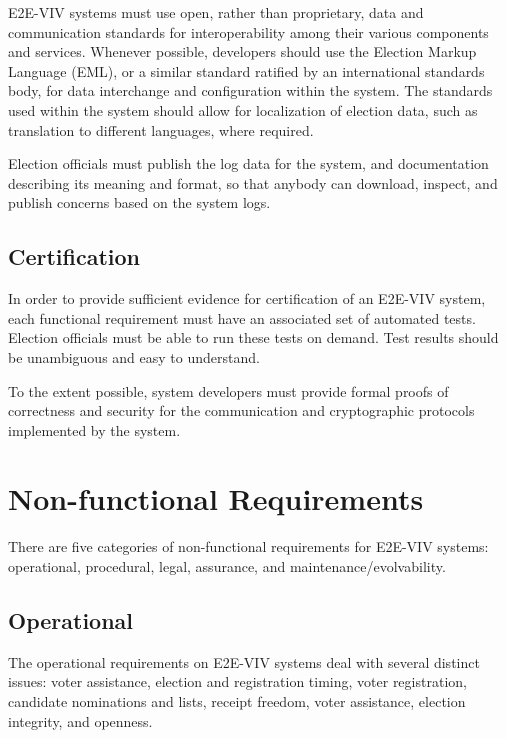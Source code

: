 E2E-VIV systems must use open, rather than proprietary, data and
communication standards for interoperability among their various
components and services. Whenever possible, developers should use the
Election Markup Language (EML), or a similar standard ratified by an
international standards body, for data interchange and configuration
within the system. The standards used within the system should allow
for localization of election data, such as translation to different
languages, where required.

Election officials must publish the log data for the system, and
documentation describing its meaning and format, so that anybody can
download, inspect, and publish concerns based on the system logs.

\subsection{Certification}

In order to provide sufficient evidence for certification of an
E2E-VIV system, each functional requirement must have an associated
set of automated tests. Election officials must be able to run these
tests on demand. Test results should be unambiguous and easy to
understand.

To the extent possible, system developers must provide formal proofs
of correctness and security for the communication and cryptographic
protocols implemented by the system.

\section{Non-functional Requirements}

There are five categories of non-functional requirements for E2E-VIV
systems: operational, procedural, legal, assurance, and
maintenance/evolvability.

\subsection{Operational}
\label{req:operational}

The operational requirements on E2E-VIV systems deal with several
distinct issues: voter assistance, election and registration timing,
voter registration, candidate nominations and lists, receipt freedom,
voter assistance, election integrity, and openness.

